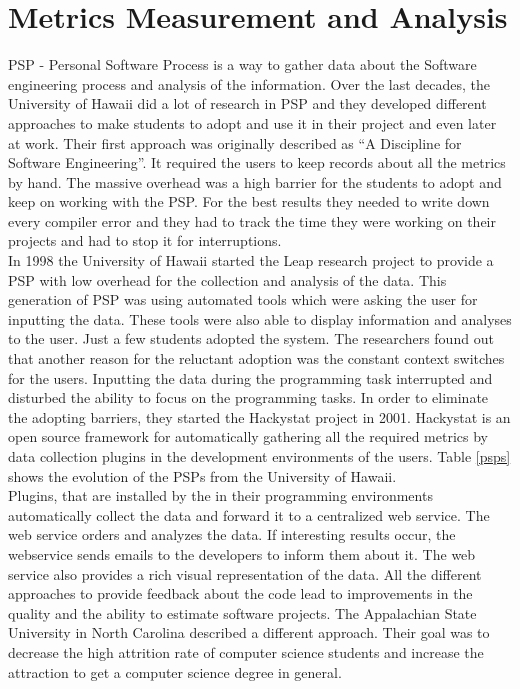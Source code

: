 \section{Metrics Measurement and Analysis}
PSP - Personal Software Process is a way to gather data about the Software engineering process and analysis of the information.
Over the last decades, the University of Hawaii did a lot of research in PSP and they developed different approaches to make students to adopt and use it in their project and even later at work.
Their first approach was originally described as ``A Discipline for Software Engineering''. It required the users to keep records about all the metrics by hand. The massive overhead was a high barrier for the students to adopt and keep on working with the PSP. For the best results they needed to write down every compiler error and they had to track the time they were working on their projects and had to stop it for interruptions.\\
In 1998 the University of Hawaii started the Leap research project to provide a PSP with low overhead for the collection and analysis of the data. This generation of PSP was using automated tools which were asking the user for inputting the data. These tools were also able to display information and analyses to the user.
Just a few students adopted the system. The researchers found out that another reason for the reluctant adoption was the constant context switches for the users. Inputting the data during the programming task interrupted and disturbed the ability to focus on the programming tasks. \cite{johnson2003beyond}
In order to eliminate the adopting barriers, they started the Hackystat project in 2001. Hackystat is an open source framework for automatically gathering all the required metrics by data collection plugins in the development environments of the users. Table \ref{psps} shows the evolution of the PSPs from the University of Hawaii.\\
Plugins, that are installed by the in their programming environments automatically collect the data and forward it to a centralized web service. The web service orders and analyzes the data. If interesting results occur, the webservice sends emails to the developers to inform them about it. The web service also provides a rich visual representation of the data.
All the different approaches to provide feedback about the code lead to improvements in the quality and the ability to estimate software projects. \cite{johnson2001project} 
The Appalachian State University in North Carolina described a different approach. Their goal was to decrease the high attrition rate of computer science students and increase the attraction to get a computer science degree in general.\\
